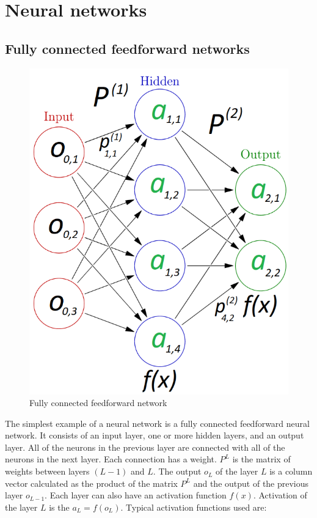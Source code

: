 \section{Neural networks}


\subsection{Fully connected feedforward networks}

\begin{figure}[b!]
	\centering
	\includegraphics[totalheight=7cm]{pics/nn_1.png}
	\caption{Fully connected feedforward network}
	\label{fig:nn1}
\end{figure}

The simplest example of a neural network is a fully connected feedforward neural network. It consists of an input layer, one or more hidden layers, and an output layer. All of the neurons in the previous layer are connected with all of the neurons in the next layer. Each connection has a weight. $ P^L $ is the matrix of weights between layers $ (L - 1) $ and $ L $. The output $ o_L $ of the layer $ L $ is a column vector calculated as the product of the matrix $ P^L $ and the output of the previous layer $ o_{L-1} $. Each layer can also have an activation function $ f(x) $. Activation of the layer $ L $ is the $ a_L = f(o_L) $. Typical activation functions used are:

